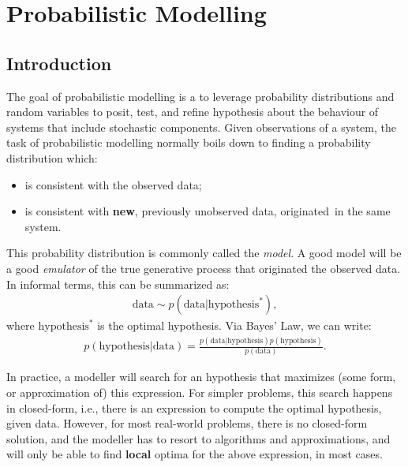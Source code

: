 \chapter{Probabilistic Modelling}
\label{chapter:probmodel}

\section{Introduction}
\label{section:probmodelintro}
The goal of probabilistic modelling is a to leverage probability distributions
and random variables to posit, test, and refine hypothesis about the behaviour of
systems that include stochastic components. Given observations of a system, the
task of probabilistic modelling normally boils down to finding a probability
distribution which:
\begin{itemize}
    \item is consistent with the observed data;
    \item is consistent with \textbf{new}, previously unobserved data, originated\
        in the same system.
\end{itemize}

This probability distribution is commonly called the \emph{model}. A good model
will be a good \emph{emulator} of the true generative process that originated
the observed data. In informal terms, this can be summarized as:
\begin{align}
    \mbox{data} \sim p(\mbox{data}|\mbox{hypothesis}^*),
\end{align} where $\text{hypothesis}^*$ is the optimal hypothesis. Via Bayes' Law,
we can write:
\begin{align}
    p(\mbox{hypothesis}|\mbox{data}) = \frac{p(\mbox{data}|\mbox{hypothesis})p(\mbox{hypothesis})}{p(\mbox{data})} \label{eq:bayes}.
\end{align}

In practice, a modeller will search for an hypothesis that maximizes (some form,
or approximation of) this expression. For simpler problems, this search happens
in closed-form, i.e., there is an expression to compute the optimal hypothesis,
given data. However, for most real-world problems, there is no closed-form solution,
and the modeller has to resort to algorithms and approximations, and will only
be able to find \textbf{local} optima for the above expression, in most cases.

